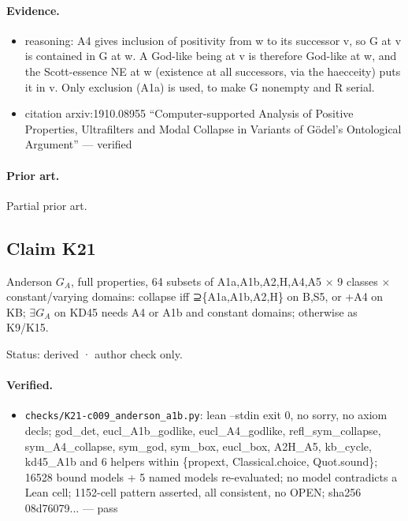 \documentclass{article}
\begin{document}
\paragraph{Evidence.}
\begin{itemize}
\item reasoning: A4 gives inclusion of positivity from w to its successor v, so G at v is contained in G at w. A God-like being at v is therefore God-like at w, and the Scott-essence NE at w (existence at all successors, via the haecceity) puts it in v. Only exclusion (A1a) is used, to make G nonempty and R serial.
\item citation arxiv:1910.08955 “Computer-supported Analysis of Positive Properties, Ultrafilters and Modal Collapse in Variants of Gödel’s Ontological Argument” --- verified
\end{itemize}

\paragraph{Prior art.} Partial prior art.

\subsection*{Claim K21}

Anderson $G_A$, full properties, 64 subsets of A1a,A1b,A2,H,A4,A5 $\times$ 9 classes $\times$ constant/varying domains: collapse iff ⊇\{A1a,A1b,A2,H\} on B,S5, or +A4 on KB; $\exists G_A$ on KD45 needs A4 or A1b and constant domains; otherwise as K9/K15.

Status: derived · author check only.

\paragraph{Verified.}
\begin{itemize}
\item \texttt{checks/K21-c009\_anderson\_a1b.py}: lean --stdin exit 0, no sorry, no axiom decls; god\_det, eucl\_A1b\_godlike, eucl\_A4\_godlike, refl\_sym\_collapse, sym\_A4\_collapse, sym\_god, sym\_box, eucl\_box, A2H\_A5, kb\_cycle, kd45\_A1b and 6 helpers within \{propext, Classical.choice, Quot.sound\}; 16528 bound models + 5 named models re-evaluated; no model contradicts a Lean cell; 1152-cell pattern asserted, all consistent, no OPEN; sha256 08d76079... --- pass
\end{itemize}
\end{document}
